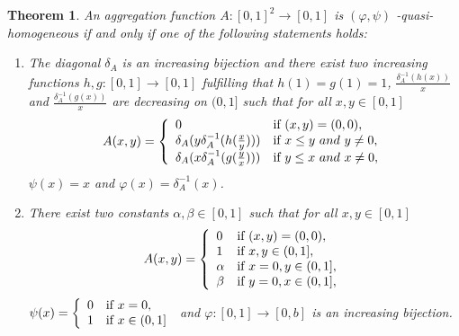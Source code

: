 \documentclass[12pt]{article}
\newtheorem{theorem}{\bf Theorem}[section]
\begin{document}
\begin{theorem}\label{th3.2}
An aggregation function $A:[0, 1]^2\rightarrow[0, 1]$ is $(\varphi, \psi)$ \emph{-quasi-homogeneous} if and only if one of the following statements holds:
\begin{enumerate}
\item [(\romannumeral 1)] The diagonal $\delta_{A}$ is an increasing bijection and there exist two increasing functions $h, g : [0, 1] \rightarrow[0, 1]$ fulfilling that $h(1)=g(1)=1$, $\frac{\delta_{A}^{-1}(h(x))}{x}$ and $\frac{\delta_{A}^{-1}(g(x))}{x}$ are decreasing on $(0, 1]$ such that for all $x, y\in [0,1]$
\begin{equation}\label{eq3.10}
A(x,y)=\left\{\begin{array}{ll}
0 & {\mbox{\scriptsize\normalsize if  } (x,y)=(0,0)},\\
\delta_{A}(y\delta_{A}^{-1}(h(\frac{x}{y}))) & {\mbox{\scriptsize\normalsize if  } x\leq y \ and\  y\neq0},\\
\delta_{A}(x\delta_{A}^{-1}(g(\frac{y}{x}))) & {\mbox{\scriptsize\normalsize if  } y\leq x \ and\ x\neq0},
\end{array}
\right.
\end{equation}
$\psi(x)=x$ and $\varphi(x)=\delta_{A}^{-1}(x)$.
\item [(\romannumeral 2)] There exist two constants $\alpha, \beta \in [0, 1]$ such that for all $x, y\in [0,1]$
\begin{equation}\label{eq3.11}
A(x,y)=\left\{\begin{array}{ll}
0 & {\mbox{\scriptsize\normalsize if  } (x,y)=(0,0)},\\
1 & {\mbox{\scriptsize\normalsize if  } x,y \in(0, 1]},\\
\alpha & {\mbox{\scriptsize\normalsize if  } x=0, y\in(0, 1]},\\
\beta & {\mbox{\scriptsize\normalsize if  } y=0, x\in(0, 1]},
\end{array}
\right.
\end{equation}
$\psi(x)=\left\{\begin{array}{ll}
0 & {\mbox{\scriptsize\normalsize if } x=0,}\\
1 & {\mbox{\scriptsize\normalsize if } x \in(0, 1]}
\end{array}
\right.$
and $\varphi:[0, 1] \rightarrow[0, b]$ is an increasing bijection.


\end{enumerate}
\end{theorem}
\end{document}
